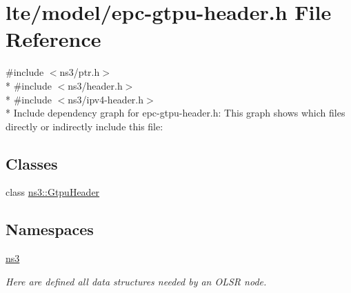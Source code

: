 \hypertarget{epc-gtpu-header_8h}{}\section{lte/model/epc-\/gtpu-\/header.h File Reference}
\label{epc-gtpu-header_8h}
{\ttfamily \#include $<$ns3/ptr.\+h$>$}\\*
{\ttfamily \#include $<$ns3/header.\+h$>$}\\*
{\ttfamily \#include $<$ns3/ipv4-\/header.\+h$>$}\\*
Include dependency graph for epc-\/gtpu-\/header.h\+:
This graph shows which files directly or indirectly include this file\+:
\subsection*{Classes}
\begin{DoxyCompactItemize}
\item 
class \hyperlink{classns3_1_1GtpuHeader}{ns3\+::\+Gtpu\+Header}
\end{DoxyCompactItemize}
\subsection*{Namespaces}
\begin{DoxyCompactItemize}
\item 
 \hyperlink{namespacens3}{ns3}
\begin{DoxyCompactList}\small\item\em Here are defined all data structures needed by an O\+L\+SR node. \end{DoxyCompactList}\end{DoxyCompactItemize}
